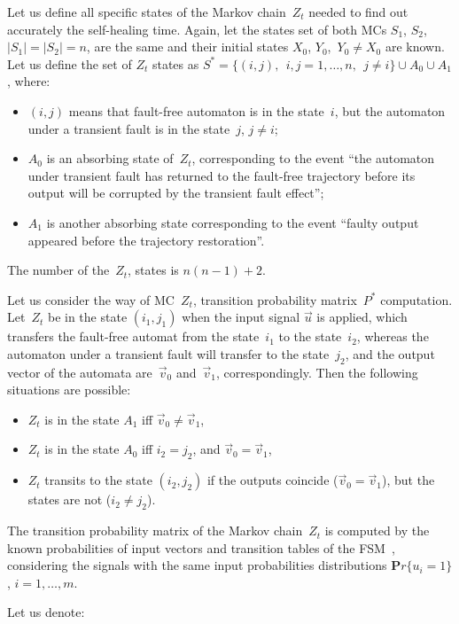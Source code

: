 \begin{multicols}{2}
Let us define all specific states of the Markov chain~$Z_t$ needed
to find out accurately the  self-healing time. Again, let  the
states set of both MCs $S_1$, $S_2$,\ \ $|S_1|=|S_2|= n$, are the
same and their initial states $X_0 $, $Y_0$,\  $Y_0 \ne X_0$
are known. Let us define the set of $Z_t$ states as $S^* =
\{(i,j),\ \ i,j = 1,\ldots,n,\ \ j \ne i\} \cup A_0\cup A_1$,
where:
\begin{itemize}
\item
$(i,j)$ means that fault-free automaton is in the state~$i$,
but the automaton under a transient fault is in the state~$j$,
$j\ne i$;
\item
$A_0$ is an absorbing state of~$Z_t$, corresponding
to the event ``the automaton under transient fault has returned
to the fault-free trajectory before its output will be corrupted
by the transient fault effect'';
\item
$A_1$ is another absorbing state corresponding to the event
``faulty output appeared  before the trajectory restoration''.
\end{itemize}

The number of the~$Z_t$, states is $n(n-1)+2$.

Let us consider the way of MC~$Z_t$, transition
probability matrix~$P^*$ computation.
Let~$Z_t$  be in the state $(i_1,j_1)$ when the input signal
$\vec u$ is applied, which transfers the fault-free automat
from the state~$i_1$ to the state~$i_2$, whereas the
automaton under a transient fault
will transfer to the state~$j_2$, and the output vector
of the automata are~$\vec v_0$ and~$\vec v_1$, correspondingly.
Then the following situations are possible:
\begin{itemize}
\item $Z_t$ is in the state $A_1$ iff $\vec v_0 \ne \vec v_1$,
\item
$Z_t$ is in the state $A_0$ iff $i_2=j_2$, and $\vec v_0 =\vec v_1$,
\item
$Z_t$ transits to the state $(i_2,j_2)$ if the outputs
coincide ($\vec v_0=\vec v_1$), but the states are not ($i_2\ne j_2$).
\end{itemize}

The transition probability matrix of the Markov chain~$Z_t$ is computed by the known probabilities of input
vectors and transition tables of the FSM~\cite{7fr}, considering
the signals with the same input probabilities
distributions ${\mathbf Pr}\{u_i=1\}$, $i=1,\ldots,m$.

Let us denote:


\end{multicols}
